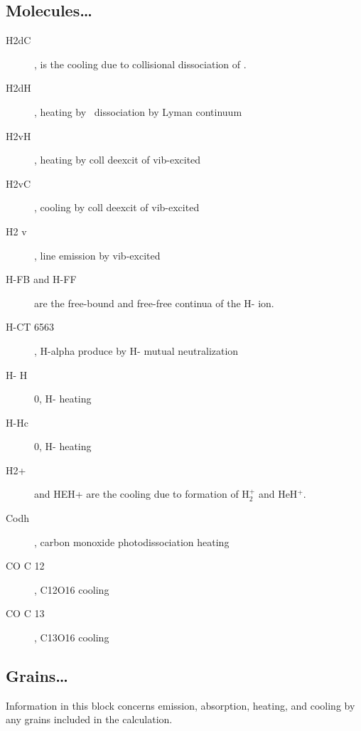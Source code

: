 \subsection{Molecules\dots}

\begin{description}

\item[H2dC], is the cooling due to collisional dissociation of \htwo.

\item[H2dH], heating by \htwo\ dissociation by Lyman continuum

\item[H2vH], heating by coll deexcit of vib-excited \htwo\

\item[H2vC], cooling by coll deexcit of vib-excited \htwo\

\item[H2 v], line emission by vib-excited \htwo\

\item[H-FB and H-FF] are the free-bound and free-free continua of the H- ion.

\item[H-CT 6563], H-alpha produce by H- mutual neutralization

\item[H- H]    0, H- heating

\item[H-Hc]    0, H- heating

\item[H2+] and HEH+ are the cooling due to formation of H$_2^+$ and HeH$^+$.

\item[Codh], carbon monoxide photodissociation heating

\item[CO C   12], C12O16 cooling

\item[CO C   13], C13O16 cooling

\end{description}

\subsection{Grains\dots}

Information in this block concerns emission, absorption, heating, and
cooling by any grains included in the calculation.

